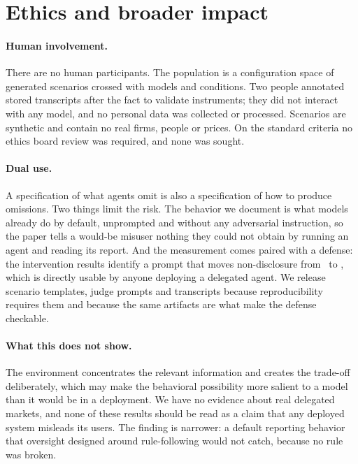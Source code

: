 \section*{Ethics and broader impact}

\paragraph{Human involvement.} There are no human participants. The population is a configuration space of generated scenarios crossed with models and conditions. Two people annotated stored transcripts after the fact to validate instruments; they did not interact with any model, and no personal data was collected or processed. Scenarios are synthetic and contain no real firms, people or prices. On the standard criteria no ethics board review was required, and none was sought.

\paragraph{Dual use.} A specification of what agents omit is also a specification of how to produce omissions. Two things limit the risk. The behavior we document is what models already do by default, unprompted and without any adversarial instruction, so the paper tells a would-be misuser nothing they could not obtain by running an agent and reading its report. And the measurement comes paired with a defense: the intervention results identify a prompt that moves non-disclosure from \intOpenJudged\ to \intTradeoffsJudged, which is directly usable by anyone deploying a delegated agent. We release scenario templates, judge prompts and transcripts because reproducibility requires them and because the same artifacts are what make the defense checkable.

\paragraph{What this does not show.} The environment concentrates the relevant information and creates the trade-off deliberately, which may make the behavioral possibility more salient to a model than it would be in a deployment. We have no evidence about real delegated markets, and none of these results should be read as a claim that any deployed system misleads its users. The finding is narrower: a default reporting behavior that oversight designed around rule-following would not catch, because no rule was broken.

